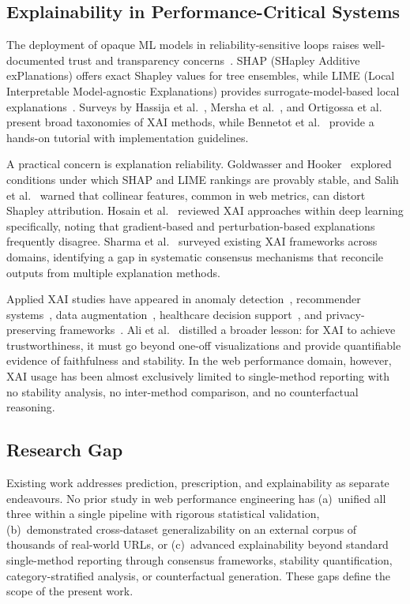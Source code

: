 \documentclass[sn-nature]{sn-jnl}
\begin{document}
\subsection{Explainability in Performance-Critical Systems}

The deployment of opaque ML models in reliability-sensitive loops raises well-documented trust and transparency concerns~\cite{goyal2025, ali2023}. SHAP (SHapley Additive exPlanations) offers exact Shapley values for tree ensembles, while LIME (Local Interpretable Model-agnostic Explanations) provides surrogate-model-based local explanations~\cite{salih2024, hassija2024, ortigossa2024}. Surveys by Hassija et al.~\cite{hassija2024}, Mersha et al.~\cite{mersha2024}, and Ortigossa et al.~\cite{ortigossa2024} present broad taxonomies of XAI methods, while Bennetot et al.~\cite{bennetot2024} provide a hands-on tutorial with implementation guidelines.

A practical concern is explanation reliability. Goldwasser and Hooker~\cite{goldwasser2024} explored conditions under which SHAP and LIME rankings are provably stable, and Salih et al.~\cite{salih2024} warned that collinear features, common in web metrics, can distort Shapley attribution. Hosain et al.~\cite{hosain2024} reviewed XAI approaches within deep learning specifically, noting that gradient-based and perturbation-based explanations frequently disagree. Sharma et al.~\cite{zhou2024} surveyed existing XAI frameworks across domains, identifying a gap in systematic consensus mechanisms that reconcile outputs from multiple explanation methods.

Applied XAI studies have appeared in anomaly detection~\cite{alam2024}, recommender systems~\cite{benleulmi2025, rahim2025}, data augmentation~\cite{mersha2025}, healthcare decision support~\cite{yang2025}, and privacy-preserving frameworks~\cite{bhardwaj2025}. Ali et al.~\cite{ali2023} distilled a broader lesson: for XAI to achieve trustworthiness, it must go beyond one-off visualizations and provide quantifiable evidence of faithfulness and stability. In the web performance domain, however, XAI usage has been almost exclusively limited to single-method reporting with no stability analysis, no inter-method comparison, and no counterfactual reasoning.

\subsection{Research Gap}

Existing work addresses prediction, prescription, and explainability as separate endeavours. No prior study in web performance engineering has (a)~unified all three within a single pipeline with rigorous statistical validation, (b)~demonstrated cross-dataset generalizability on an external corpus of thousands of real-world URLs, or (c)~advanced explainability beyond standard single-method reporting through consensus frameworks, stability quantification, category-stratified analysis, or counterfactual generation. These gaps define the scope of the present work.
\end{document}
